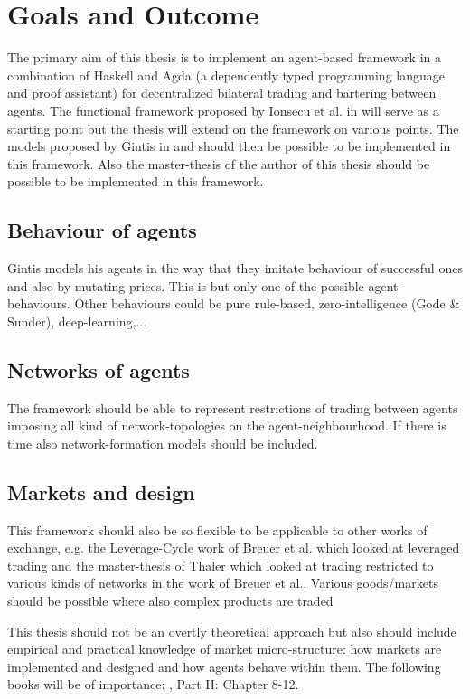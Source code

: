 \documentclass{article}
\begin{document}
\section{Goals and Outcome}
The primary aim of this thesis is to implement an agent-based framework in a combination of Haskell and Agda (a dependently typed programming language and proof assistant) for decentralized bilateral trading and bartering between agents. The functional framework proposed by Ionsecu et al. in \cite{Botta20114025} will serve as a starting point but the thesis will extend on the framework on various points. The models proposed by Gintis in \cite{Gintis2006} and \cite{gintis_dynamics_2007}  should then be possible to be implemented in this framework. Also the master-thesis of the author of this thesis should be possible to be implemented in this framework.

\subsection{Behaviour of agents}
Gintis models his agents in the way that they imitate behaviour of successful ones and also by mutating prices. This is but only one of the possible agent-behaviours. Other behaviours could be pure rule-based, zero-intelligence (Gode \& Sunder), deep-learning,...

\subsection{Networks of agents}
The framework should be able to represent restrictions of trading between agents imposing all kind of network-topologies on the agent-neighbourhood. If there is time also network-formation models should be included.

\subsection{Markets and design}
This framework should also be so flexible to be applicable to other works of exchange, e.g. the Leverage-Cycle work of Breuer et al. which looked at leveraged trading and the master-thesis of Thaler which looked at trading restricted to various kinds of networks in the work of Breuer et al.. Various goods/markets should be possible where also complex products are traded

This thesis should not be an overtly theoretical approach but also should include empirical and practical knowledge of market micro-structure: how markets are implemented and designed and how agents behave within them. The following books will be of importance: \cite{LehalleLaruelle2013}, \cite{baker_market_2013} Part II: Chapter 8-12.
\end{document}
